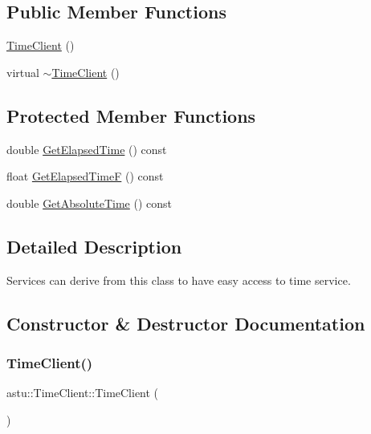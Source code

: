 \subsection*{Public Member Functions}
\begin{DoxyCompactItemize}
\item 
\hyperlink{classastu_1_1TimeClient_a500d92c1cf1b0d6832f1388763b5d9b2}{Time\+Client} ()
\item 
virtual \hyperlink{classastu_1_1TimeClient_a0b579b8513031078631ead28ad318354}{$\sim$\+Time\+Client} ()
\end{DoxyCompactItemize}
\subsection*{Protected Member Functions}
\begin{DoxyCompactItemize}
\item 
double \hyperlink{classastu_1_1TimeClient_a15a3bbc197a690aee256fcf11e7b5cd0}{Get\+Elapsed\+Time} () const
\item 
float \hyperlink{classastu_1_1TimeClient_acce492f9b479370a552e7a982019a6ca}{Get\+Elapsed\+TimeF} () const
\item 
double \hyperlink{classastu_1_1TimeClient_a856f707a1d320dbc0615a3b072587a9c}{Get\+Absolute\+Time} () const
\end{DoxyCompactItemize}


\subsection{Detailed Description}
Services can derive from this class to have easy access to time service. 

\subsection{Constructor \& Destructor Documentation}
\mbox{\label{classastu_1_1TimeClient_a500d92c1cf1b0d6832f1388763b5d9b2}} 
\subsubsection{\texorpdfstring{Time\+Client()}{TimeClient()}}
{\footnotesize\ttfamily astu\+::\+Time\+Client\+::\+Time\+Client (\begin{DoxyParamCaption}{ }\end{DoxyParamCaption})\hspace{0.3cm}{\ttfamily [inline]}}

